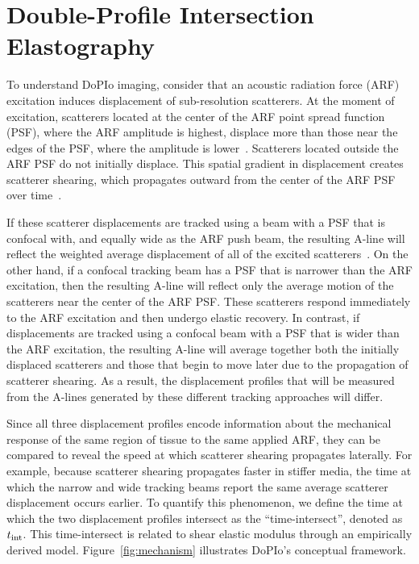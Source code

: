 \section{Double-Profile Intersection Elastography}
\label{sec:theory}

To understand DoPIo imaging, consider that an acoustic radiation force (ARF) excitation induces displacement of sub-resolution scatterers. At the moment of excitation, scatterers located at the center of the ARF point spread function (PSF), where the ARF amplitude is highest, displace more than those near the edges of the PSF, where the amplitude is lower~\cite{sarvazyan_Shear_1998, ostrovsky_NonDissipative_2006,sarvazyan_Acoustic_2021}. Scatterers located outside the ARF PSF do not initially displace. This spatial gradient in displacement creates scatterer shearing, which propagates outward from the center of the ARF PSF over time~\cite{czernuszewicz_Experimental_2013}.

If these scatterer displacements are tracked using a beam with a PSF that is confocal with, and equally wide as the ARF push beam, the resulting A-line will reflect the weighted average displacement of all of the excited scatterers~\cite{walker_fundamental_1995,mcaleavey_Estimates_2003}. On the other hand, if a confocal tracking beam has a PSF that is narrower than the ARF excitation, then the resulting A-line will reflect only the average motion of the scatterers near the center of the ARF PSF. These scatterers respond immediately to the ARF excitation and then undergo elastic recovery. In contrast, if displacements are tracked using a confocal beam with a PSF that is wider than the ARF excitation, the resulting A-line will average together both the initially displaced scatterers and those that begin to move later due to the propagation of scatterer shearing. As a result, the displacement profiles that will be measured from the A-lines generated by these different tracking approaches will differ. 

Since all three displacement profiles encode information about the mechanical response of the same region of tissue to the same applied ARF, they can be compared to reveal the speed at which scatterer shearing propagates laterally. For example, because scatterer shearing propagates faster in stiffer media, the time at which the narrow and wide tracking beams report the same average scatterer displacement occurs earlier. To quantify this phenomenon, we define the time at which the two displacement profiles intersect as the “time-intersect”, denoted as $t_{\textnormal{int}}$. This time-intersect is related to shear elastic modulus through an empirically derived model. Figure~\ref{fig:mechanism} illustrates DoPIo's conceptual framework.


